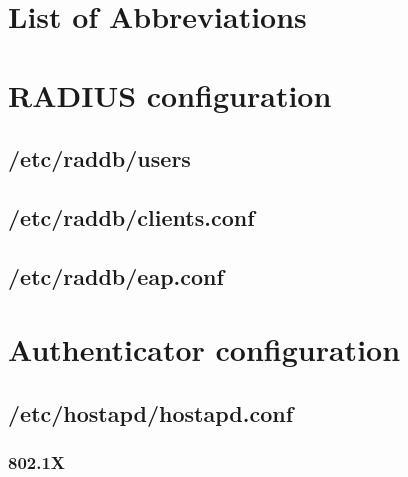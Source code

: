 \section{List of Abbreviations}
\renewcommand{\nomname}{}
\printnomenclature

\section{RADIUS configuration}
\label{sec:Code;sub:radius}

\subsection{/etc/raddb/users}



\subsection{/etc/raddb/clients.conf}



\subsection{/etc/raddb/eap.conf}



\section{Authenticator configuration}
\label{sec:Code;sub:authenticator}

\subsection{/etc/hostapd/hostapd.conf}
\subsubsection{802.1X}


